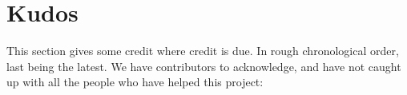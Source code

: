 %
%
%

\section{Kudos}
\label{sec:kudos}

   This section gives some credit where credit is due.
   In rough chronological order, last being the latest.
   We have contributors to acknowledge, and have not caught up with all the
   people who have helped this project:

